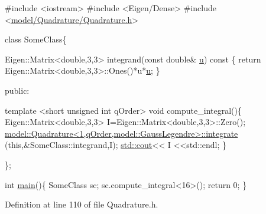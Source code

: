 \begin{DoxyCode}
\textcolor{preprocessor}{#include <iostream>}
\textcolor{preprocessor}{#include <Eigen/Dense>}
\textcolor{preprocessor}{#include <\hyperlink{_quadrature_8h}{model/Quadrature/Quadrature.h}>}

\textcolor{keyword}{class }SomeClass\{

    Eigen::Matrix<double,3,3> integrand(\textcolor{keyword}{const} \textcolor{keywordtype}{double}& \hyperlink{run_multipole_8m_a6277e2a7446059985dc9bcf0a4ac1a8f}{u})\textcolor{keyword}{ const }\{
        \textcolor{keywordflow}{return} Eigen::Matrix<double,3,3>::Ones()*u*\hyperlink{run_multipole_8m_a6277e2a7446059985dc9bcf0a4ac1a8f}{u};
    \}

    \textcolor{keyword}{public}:

    \textcolor{keyword}{template} <\textcolor{keywordtype}{short} \textcolor{keywordtype}{unsigned} \textcolor{keywordtype}{int} qOrder>
    \textcolor{keywordtype}{void} compute\_integral()\{
        Eigen::Matrix<double,3,3> I=Eigen::Matrix<double,3,3>::Zero();
        \hyperlink{structmodel_1_1_quadrature_a8820266eebe25109afe7e4cab4eda438}{model::Quadrature<1,qOrder,model::GaussLegendre>::integrate}
      (\textcolor{keyword}{this},&SomeClass::integrand,I);
        \hyperlink{namespacemodel_a0ce25fef078a7d9d9cb7cfbabcfbc289}{std::cout}<< I <<std::endl;
    \}

\};

\textcolor{keywordtype}{int} \hyperlink{bench_2bary_search_2main_8cpp_a0ddf1224851353fc92bfbff6f499fa97}{main}()\{
        SomeClass sc;
 sc.compute\_integral<16>();
        \textcolor{keywordflow}{return} 0;
\}
\end{DoxyCode}


Definition at line 110 of file Quadrature.\+h.

\hypertarget{structmodel_1_1_quadrature_a8017fe27223310ab200e78b9f8b9b7e5}{}
